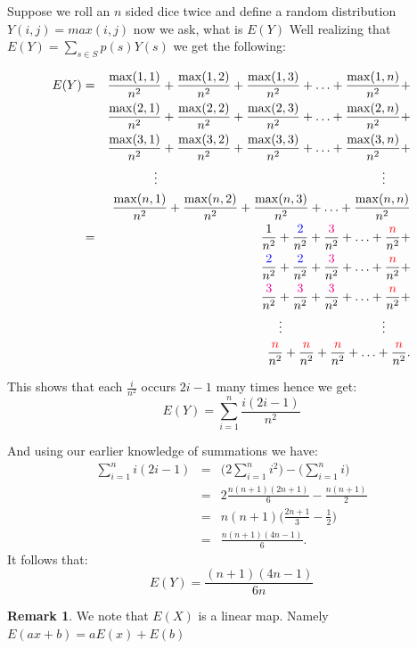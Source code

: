 \documentclass[titlepage]{article}
\theoremstyle{definition}
\newtheorem{remark}{Remark}
\numberwithin{equation}{subsection}
\numberwithin{remark}{subsection}
\begin{document}
Suppose we roll an $n$ sided dice twice and define a random distribution $Y(i,j) = max(i,j)$ now we ask, what is $E(Y)$ Well realizing that $E(Y) = \sum_{s\in S} p(s)Y(s)$ we get the following:

\begin{eqnarray*}
E(Y)&=&\frac{\max(1,1)}{n^2}+\frac{\max(1,2)}{n^2}+\frac{\max(1,3)}{n^2}+\ldots+\frac{\max(1,n)}{n^2}+\\
&&\frac{\max(2,1)}{n^2}+\frac{\max(2,2)}{n^2}+\frac{\max(2,3)}{n^2}+\ldots+\frac{\max(2,n)}{n^2}+\\
&&\frac{\max(3,1)}{n^2}+\frac{\max(3,2)}{n^2}+\frac{\max(3,3)}{n^2}+\ldots+\frac{\max(3,n)}{n^2}+\\
&&\qquad\vdots\qquad\qquad\qquad\qquad\qquad\qquad\qquad\qquad\qquad\vdots\qquad\\
&&\frac{\max(n,1)}{n^2}+\frac{\max(n,2)}{n^2}+\frac{\max(n,3)}{n^2}+\ldots+\frac{\max(n,n)}{n^2}\\
&=&\frac1{n^2}+\frac{\color{blue}{2}}{n^2}+\frac{\color{magenta}{3}}{n^2}+\ldots+\frac{{\color{red}{n}}}{n^2}+\\
&&\frac{\color{blue}{2}}{n^2}+\frac{\color{blue}{2}}{n^2}+\frac{\color{magenta}{3}}{n^2}+\ldots+\frac{{\color{red}{n}}}{n^2}+\\
&&\frac{\color{magenta}{3}}{n^2}+\frac{\color{magenta}{3}}{n^2}+\frac{\color{magenta}{3}}{n^2}+\ldots+\frac{{\color{red}{n}}}{n^2}+\\
&&\qquad\vdots\qquad\qquad\qquad\qquad\vdots\qquad\\
&&\frac{{\color{red}{n}}}{n^2}+\frac{{\color{red}{n}}}{n^2}+\frac{{\color{red}{n}}}{n^2}+\ldots+\frac{{\color{red}{n}}}{n^2}.
\end{eqnarray*}

This shows that each $\frac{i}{n^{2}}$ occurs $2i - 1$ many times hence we get:
$$E(Y)=\sum_{i=1}^n\frac{i(2i-1)}{n^2}$$

And using our earlier knowledge of summations we have:
\begin{eqnarray*}
\sum_{i=1}^ni(2i-1)&=&\big(2 \sum_{i=1}^ni^2\big)-\big(\sum_{i=1}^ni\big)\\
&=&2\frac{n(n+1)(2n+1)}6-\frac{n(n+1)}2\\
&=&n(n+1)\big(\frac{2n+1}3-\frac12\big)\\
&=&\frac{n(n+1)(4n-1)}6.
\end{eqnarray*}
It follows that:
$$E(Y)=\frac{(n+1)(4n-1)}{6n}$$


\begin{remark}
We note that $E(X)$ is a linear map. Namely $E(ax+b) = aE(x) + E(b)$
\end{remark}
\end{document}
